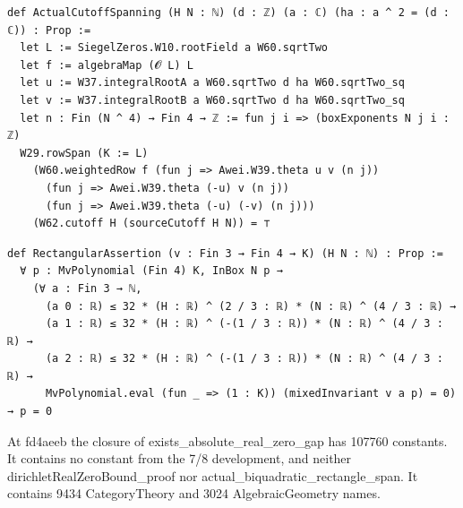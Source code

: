 \begin{listing}[tbp]
\caption{The main route's spanning statement, OAI/\allowbreak NumberTheory/\allowbreak SiegelZeros/\allowbreak Structure/\allowbreak ArithmeticCutoffTransport.lean:356-366 (openai/math fd4aeeb).}\label{lst:cutoff-spanning} %
\begin{Verbatim}
def ActualCutoffSpanning (H N : ℕ) (d : ℤ) (a : ℂ) (ha : a ^ 2 = (d : ℂ)) : Prop :=
  let L := SiegelZeros.W10.rootField a W60.sqrtTwo
  let f := algebraMap (𝓞 L) L
  let u := W37.integralRootA a W60.sqrtTwo d ha W60.sqrtTwo_sq
  let v := W37.integralRootB a W60.sqrtTwo d ha W60.sqrtTwo_sq
  let n : Fin (N ^ 4) → Fin 4 → ℤ := fun j i => (boxExponents N j i : ℤ)
  W29.rowSpan (K := L)
    (W60.weightedRow f (fun j => Awei.W39.theta u v (n j))
      (fun j => Awei.W39.theta (-u) v (n j))
      (fun j => Awei.W39.theta (-u) (-v) (n j)))
    (W62.cutoff H (sourceCutoff H N)) = ⊤
\end{Verbatim}
\end{listing}

\begin{listing}[tbp]
\caption{The zero test on the main route, OAI/\allowbreak NumberTheory/\allowbreak SiegelZeros/\allowbreak Determinants/\allowbreak RectangleDeterminant.lean:31-37 (openai/math fd4aeeb).}\label{lst:rect-assertion} %
\begin{Verbatim}
def RectangularAssertion (v : Fin 3 → Fin 4 → K) (H N : ℕ) : Prop :=
  ∀ p : MvPolynomial (Fin 4) K, InBox N p →
    (∀ a : Fin 3 → ℕ,
      (a 0 : ℝ) ≤ 32 * (H : ℝ) ^ (2 / 3 : ℝ) * (N : ℝ) ^ (4 / 3 : ℝ) →
      (a 1 : ℝ) ≤ 32 * (H : ℝ) ^ (-(1 / 3 : ℝ)) * (N : ℝ) ^ (4 / 3 : ℝ) →
      (a 2 : ℝ) ≤ 32 * (H : ℝ) ^ (-(1 / 3 : ℝ)) * (N : ℝ) ^ (4 / 3 : ℝ) →
      MvPolynomial.eval (fun _ => (1 : K)) (mixedInvariant v a p) = 0) → p = 0
\end{Verbatim}
\end{listing}

At fd4aeeb the closure of exists\_absolute\_real\_zero\_gap has 107760 constants. %
It contains no constant from the 7/8 development, and neither dirichletRealZeroBound\_proof nor actual\_biquadratic\_rectangle\_span. %
It contains 9434 CategoryTheory and 3024 AlgebraicGeometry names. %

